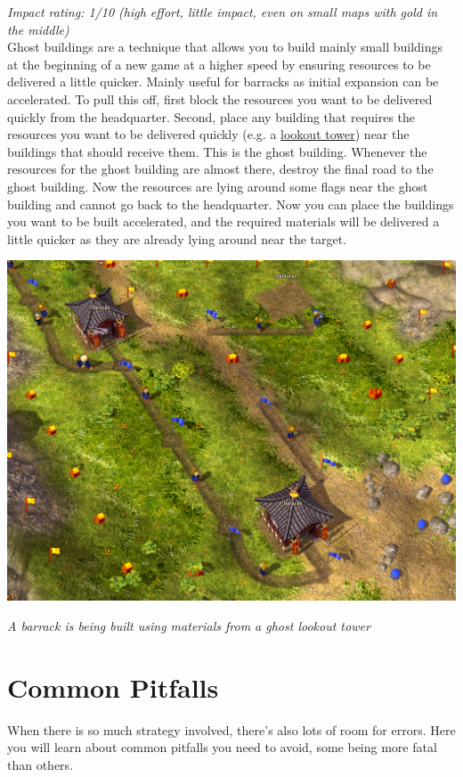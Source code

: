 \documentclass[12pt]{article}
\begin{document}
\textit{Impact rating: 1/10 (high effort, little impact, even on small maps with gold in the middle)}\\

Ghost buildings are a technique that allows you to build mainly small buildings at the beginning of a new game at a higher speed by ensuring resources to be delivered a little quicker. Mainly useful for barracks as initial expansion can be accelerated.
To pull this off, first block the resources you want to be delivered quickly from the headquarter. Second, place any building that requires the resources you want to be delivered quickly (e.g. a \hyperref[sec:lookouttower]{lookout tower}) near the buildings that should receive them. This is the ghost building. Whenever the resources for the ghost building are almost there, destroy the final road to the ghost building. Now the resources are lying around some flags near the ghost building and cannot go back to the headquarter. Now you can place the buildings you want to be built accelerated, and the required materials will be delivered a little quicker as they are already lying around near the target.

\includegraphics[width=\textwidth]{ghostbuilding_crop}

\textit{A barrack is being built using materials from a ghost lookout tower}


\section{Common Pitfalls}
\label{sec:commonpitfalls}

When there is so much strategy involved, there's also lots of room for errors. Here you will learn about common pitfalls you need to avoid, some being more fatal than others.
\end{document}
